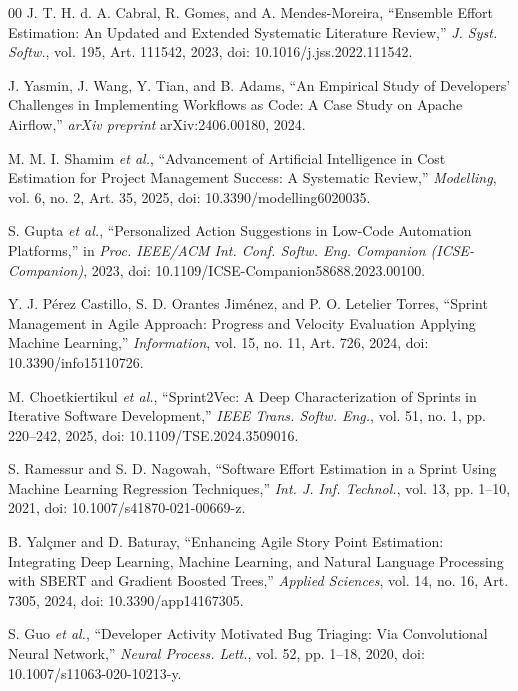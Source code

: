 \documentclass[conference]{IEEEtran}
\begin{document}
\begin{thebibliography}{00}
J. T. H. d. A. Cabral, R. Gomes, and A. Mendes-Moreira,
``Ensemble Effort Estimation: An Updated and Extended Systematic Literature Review,''
\textit{J. Syst. Softw.}, vol. 195, Art. 111542, 2023,
doi: 10.1016/j.jss.2022.111542.

J. Yasmin, J. Wang, Y. Tian, and B. Adams, ``An Empirical Study of Developers' Challenges in Implementing Workflows as Code: A Case Study on Apache Airflow,''
\textit{arXiv preprint} arXiv:2406.00180, 2024.


M. M. I. Shamim \textit{et al.},
``Advancement of Artificial Intelligence in Cost Estimation for Project Management Success: A Systematic Review,''
\textit{Modelling}, vol. 6, no. 2, Art. 35, 2025,
doi: 10.3390/modelling6020035.

S. Gupta \textit{et al.}, ``Personalized Action Suggestions in Low-Code Automation Platforms,''
in \textit{Proc. IEEE/ACM Int. Conf. Softw. Eng. Companion (ICSE-Companion)}, 2023,
doi: 10.1109/ICSE-Companion58688.2023.00100.

Y. J. P\'erez Castillo, S. D. Orantes Jim\'enez, and P. O. Letelier Torres,
``Sprint Management in Agile Approach: Progress and Velocity Evaluation Applying Machine Learning,''
\textit{Information}, vol. 15, no. 11, Art. 726, 2024,
doi: 10.3390/info15110726.

M. Choetkiertikul \textit{et al.},
``Sprint2Vec: A Deep Characterization of Sprints in Iterative Software Development,''
\textit{IEEE Trans. Softw. Eng.}, vol. 51, no. 1, pp. 220--242, 2025,
doi: 10.1109/TSE.2024.3509016.

S. Ramessur and S. D. Nagowah,
``Software Effort Estimation in a Sprint Using Machine Learning Regression Techniques,''
\textit{Int. J. Inf. Technol.}, vol. 13, pp. 1--10, 2021,
doi: 10.1007/s41870-021-00669-z.

B. Yal\c{c}{\i}ner and D. Baturay,
``Enhancing Agile Story Point Estimation: Integrating Deep Learning, Machine Learning, and Natural Language Processing with SBERT and Gradient Boosted Trees,''
\textit{Applied Sciences}, vol. 14, no. 16, Art. 7305, 2024,
doi: 10.3390/app14167305.

S. Guo \textit{et al.}, ``Developer Activity Motivated Bug Triaging: Via Convolutional Neural Network,''
\textit{Neural Process. Lett.}, vol. 52, pp. 1--18, 2020,
doi: 10.1007/s11063-020-10213-y.


\end{thebibliography}
\end{document}
